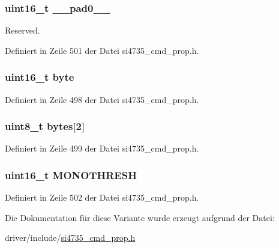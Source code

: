\subsubsection[{\+\_\+\+\_\+pad0\+\_\+\+\_\+}]{\setlength{\rightskip}{0pt plus 5cm}uint16\+\_\+t \+\_\+\+\_\+pad0\+\_\+\+\_\+}\label{unionfm__blend__mono_a77132c2c26a75f5b8751b235cda23828}


Reserved. 



Definiert in Zeile 501 der Datei si4735\+\_\+cmd\+\_\+prop.\+h.

\hypertarget{unionfm__blend__mono_ab0549c1b5ea980a02e7eab77e21fea49}{}
\subsubsection[{byte}]{\setlength{\rightskip}{0pt plus 5cm}uint16\+\_\+t byte}\label{unionfm__blend__mono_ab0549c1b5ea980a02e7eab77e21fea49}


Definiert in Zeile 498 der Datei si4735\+\_\+cmd\+\_\+prop.\+h.

\hypertarget{unionfm__blend__mono_a46e4c05d20a047ec169f60d3167e912e}{}
\subsubsection[{bytes}]{\setlength{\rightskip}{0pt plus 5cm}uint8\+\_\+t bytes\mbox{[}2\mbox{]}}\label{unionfm__blend__mono_a46e4c05d20a047ec169f60d3167e912e}


Definiert in Zeile 499 der Datei si4735\+\_\+cmd\+\_\+prop.\+h.

\hypertarget{unionfm__blend__mono_a5de7498b6512934529d0c6284f120805}{}
\subsubsection[{M\+O\+N\+O\+T\+H\+R\+E\+S\+H}]{\setlength{\rightskip}{0pt plus 5cm}uint16\+\_\+t M\+O\+N\+O\+T\+H\+R\+E\+S\+H}\label{unionfm__blend__mono_a5de7498b6512934529d0c6284f120805}


Definiert in Zeile 502 der Datei si4735\+\_\+cmd\+\_\+prop.\+h.



Die Dokumentation für diese Variante wurde erzeugt aufgrund der Datei\+:\begin{DoxyCompactItemize}
\item 
driver/include/\hyperlink{si4735__cmd__prop_8h}{si4735\+\_\+cmd\+\_\+prop.\+h}\end{DoxyCompactItemize}
